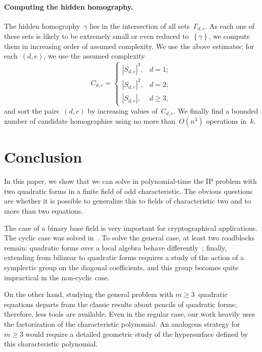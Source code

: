 \documentclass{lms}%
\def\acco#1{\left\{#1\right\}}
\def\abs#1{\left|#1\right|}
\def\card#1{\abs{#1}}
\begin{document}
\paragraph{Computing the hidden homography.}

The hidden homography~$γ$ lies in the intersection of all sets~$Γ_{d,e}$.
As each one of these sets is likely to be extremely small or even reduced
to~$\acco{γ}$, we compute them in increasing order of assumed complexity.
We use the above estimates: for each~$(d,e)$, we use the assumed complexity
\begin{equation}
C_{d,e} = \begin{cases}
\card{S_{d,e}}^3,& d = 1;\\
\card{S_{d,e}}^2,& d = 2;\\
\card{S_{d,e}},& d≥ 3,
\end{cases}
\end{equation}
and sort the pairs~$(d,e)$ by increasing values of~$C_{d,e}$. We finally
find a bounded number of candidate homographies using no more
than~$O(n^3)$ operations in~$k$.

\section*{Conclusion}

In this paper, we show that we can solve in polynomial-time the IP
problem with two quadratic forms in a finite field of odd characteristic.
The obvious questions are whether it is possible to generalize this to
fields of characteristic two and to more than two equations.

The case of a binary base field is very important for cryptographical
applications. The cyclic case was solved in~\cite{MPG2013}. To solve
the general case, at least two roadblocks remain:
quadratic
forms over a local algebra behave differently~\cite[§93]{omeara};
finally, extending from bilinear to quadratic forms requires a study of
the action of a symplectic group on the diagonal coefficients, and this
group becomes quite impractical in the non-cyclic case.

On the other hand, studying the general problem with $m ≥ 3$~quadratic
equations departs from the classic results about pencils of quadratic
forms; therefore, less tools are available. Even in the regular
case, our work heavily uses the factorization of the characteristic
polynomial. An analogous strategy for~$m ≥ 3$ would require a detailed
geometric study of the hypersurface defined by this characteristic
polynomial.
\end{document}
